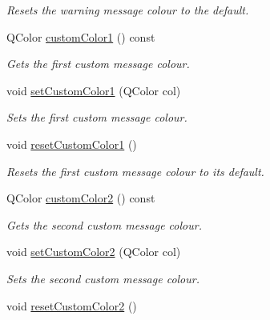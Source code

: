 \begin{DoxyCompactItemize}
\begin{DoxyCompactList}\small\item\em Resets the warning message colour to the default. \end{DoxyCompactList}\item 
Q\-Color \hyperlink{class_console_widget_a07e085ea01f992aa1de72937dba48fb2}{custom\-Color1} () const 
\begin{DoxyCompactList}\small\item\em Gets the first custom message colour. \end{DoxyCompactList}\item 
void \hyperlink{class_console_widget_a509414a25aabbf38167a8f1d57fea09c}{set\-Custom\-Color1} (Q\-Color col)
\begin{DoxyCompactList}\small\item\em Sets the first custom message colour. \end{DoxyCompactList}\item 
\hypertarget{class_console_widget_a2097aef6f449a6d2dd5f653623801f80}{void \hyperlink{class_console_widget_a2097aef6f449a6d2dd5f653623801f80}{reset\-Custom\-Color1} ()}\label{class_console_widget_a2097aef6f449a6d2dd5f653623801f80}

\begin{DoxyCompactList}\small\item\em Resets the first custom message colour to its default. \end{DoxyCompactList}\item 
Q\-Color \hyperlink{class_console_widget_a4317870d3883d218a297f2d0b2a10a06}{custom\-Color2} () const 
\begin{DoxyCompactList}\small\item\em Gets the second custom message colour. \end{DoxyCompactList}\item 
void \hyperlink{class_console_widget_a14e6815763803393376f4fd1db78821e}{set\-Custom\-Color2} (Q\-Color col)
\begin{DoxyCompactList}\small\item\em Sets the second custom message colour. \end{DoxyCompactList}\item 
\hypertarget{class_console_widget_ab3061f5106972084d70bffe9dfffb007}{void \hyperlink{class_console_widget_ab3061f5106972084d70bffe9dfffb007}{reset\-Custom\-Color2} ()}\label{class_console_widget_ab3061f5106972084d70bffe9dfffb007}


\end{DoxyCompactItemize}
